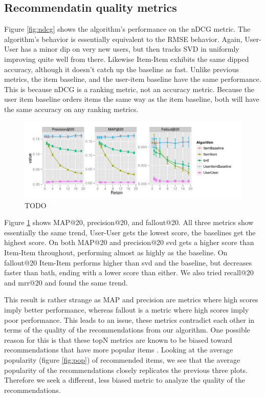 \documentclass[letterpaper]{sig-alternate}
\begin{document}
\subsection {Recommendatin quality metrics}
  Figure \ref{fig:ndcg} shows the algorithm's performance on the nDCG metric.
  The algorithm's behavior is essentially equivalent to the RMSE behavior.
  Again, User-User has a minor dip on very new users, but then tracks SVD in uniformly improving quite well from there.
  Likewise Item-Item exhibits the same dipped accuracy, although it doesn't catch up the baseline as fast.
  Unlike previous metrics, the item baseline, and the user-item baseline have the same performance.
  This is because nDCG is a ranking metric, not an accuracy metric.
  Because the user item baseline orders items the same way as the item baseline, both will have the same accuracy on any ranking metrics.



\begin{figure}[ht!]
  \centering
  \includegraphics[width=1.1\linewidth]{../lenskit/output/ekstrandTuned20/TopNPrecision.pdf}
  \caption{TODO}
  \label{fig:map}
\end{figure}


  Figure \ref{fig:map} shows MAP@20, precision@20, and fallout@20.
  All three metrics show essentially the same trend, User-User gets the lowest score, the baselines get the highest score.
  On both MAP@20 and precision@20 svd gets a higher score than Item-Item throughout, performing almost as highly as the baseline.
  On fallout@20 Item-Item performs higher than svd and the baseline, but decreases faster than bath, ending with a lower score than either. 
  We also tried recall@20 and mrr@20 and found the same trend.

  This result is rather strange as MAP and precision are metrics where high scores imply better performance, whereas fallout is a metric where high scores imply poor performance.
  This leads to an issue, these metrics contradict each other in terms of the quality of the recommendations from our algorithm.
  One possible reason for this is that these topN metrics are known to be biased toward recommendations that have more popular items \cite{bellogin}.
  Looking at the average popularity (figure \ref{fig:pop}) of recommended items, we see that the average popularity of the recommendations closely replicates the previous three plots.
  Therefore we seek a different, less biased metric to analyze the quality of the recommendations.
\end{document}
